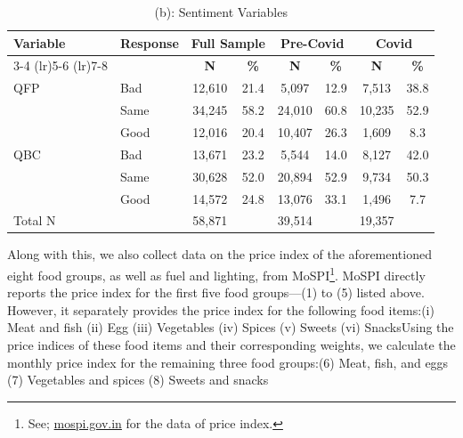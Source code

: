 \documentclass[
  abstract]{scrartcl}
\begin{document}
\begin{table}
{    \vspace{1.5em} %

    \caption*{(b): Sentiment Variables} 

    \begin{subtable}{\textwidth}
    \label{tbl-des_b}
        \centering
        \renewcommand{\arraystretch}{0.9}
        \begin{tabular}{p{3cm} p{2cm} c c c c c c}
            \toprule
            \textbf{Variable} & \textbf{Response} & \multicolumn{2}{c}{\textbf{Full Sample}} & \multicolumn{2}{c}{\textbf{Pre-Covid}} & \multicolumn{2}{c}{\textbf{Covid}} \\ 
            \cmidrule(lr){3-4} \cmidrule(lr){5-6} \cmidrule(lr){7-8}
            & & \textbf{N} & \textbf{\%} & \textbf{N} & \textbf{\%} & \textbf{N} & \textbf{\%} \\ 
            \midrule
            QFP & Bad & 12,610 & 21.4 & 5,097 & 12.9 & 7,513 & 38.8 \\ 
                & Same & 34,245 & 58.2 & 24,010 & 60.8 & 10,235 & 52.9 \\ 
                & Good & 12,016 & 20.4 & 10,407 & 26.3 & 1,609 & 8.3 \\ 
            \addlinespace
            QBC & Bad & 13,671 & 23.2 & 5,544 & 14.0 & 8,127 & 42.0 \\ 
                & Same & 30,628 & 52.0 & 20,894 & 52.9 & 9,734 & 50.3 \\ 
                & Good & 14,572 & 24.8 & 13,076 & 33.1 & 1,496 & 7.7 \\ 
            \midrule
            \multicolumn{2}{l}{Total N} & 58,871 & & 39,514 & & 19,357 & \\ 
            \bottomrule
        \end{tabular}
        \label{tbl-desc-b}
    \end{subtable}

}

\end{table}%

Along with this, we also collect data on the price index of the
aforementioned eight food groups, as well as fuel and lighting, from
MoSPI\footnote{See; \href{https://mospi.gov.in/}{mospi.gov.in} for the
  data of price index.}. MoSPI directly reports the price index for the
first five food groups---(1) to (5) listed above. However, it separately
provides the price index for the following food items:(i) Meat and fish
(ii) Egg (iii) Vegetables (iv) Spices (v) Sweets (vi) SnacksUsing the
price indices of these food items and their corresponding weights, we
calculate the monthly price index for the remaining three food
groups:(6) Meat, fish, and eggs (7) Vegetables and spices (8) Sweets and
snacks
\end{document}
